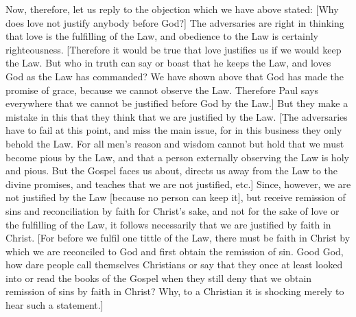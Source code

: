 Now, therefore, let us reply to the objection which we have above
stated: [Why does love not justify anybody before God?] The
adversaries are right in thinking that love is the fulfilling of the
Law, and obedience to the Law is certainly righteousness.  [Therefore
it would be true that love justifies us if we would keep the Law.
But who in truth can say or boast that he keeps the Law, and loves
God as the Law has commanded?  We have shown above that God has made
the promise of grace, because we cannot observe the Law.  Therefore
Paul says everywhere that we cannot be justified before God by the
Law.] But they make a mistake in this that they think that we are
justified by the Law.  [The adversaries have to fail at this point,
and miss the main issue, for in this business they only behold the
Law.  For all men's reason and wisdom cannot but hold that we must
become pious by the Law, and that a person externally observing the
Law is holy and pious.  But the Gospel faces us about, directs us
away from the Law to the divine promises, and teaches that we are not
justified, etc.] Since, however, we are not justified by the Law
[because no person can keep it], but receive remission of sins and
reconciliation by faith for Christ's sake, and not for the sake of
love or the fulfilling of the Law, it follows necessarily that we are
justified by faith in Christ.  [For before we fulfil one tittle of
the Law, there must be faith in Christ by which we are reconciled to
God and first obtain the remission of sin.  Good God, how dare people
call themselves Christians or say that they once at least looked into
or read the books of the Gospel when they still deny that we obtain
remission of sins by faith in Christ?  Why, to a Christian it is
shocking merely to hear such a statement.]

